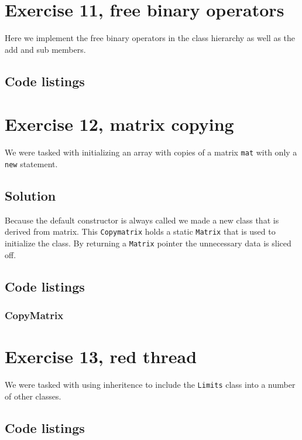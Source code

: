 \documentclass[11pt]{article}
\begin{document}
\section*{Exercise 11, free binary operators}
Here we implement the free binary operators in the class hierarchy as well as the add and sub members.

\subsection*{Code listings}






\section*{Exercise 12, matrix copying}
We were tasked with initializing an array with copies of a matrix \texttt{mat} with only a \texttt{new} statement.

\subsection*{Solution}
Because the default constructor is always called we made a new class that is derived from matrix.
This \texttt{Copymatrix} holds a static \texttt{Matrix} that is used to initialize the class.
By returning a \texttt{Matrix} pointer the unnecessary data is sliced off.

\subsection*{Code listings}





\subsubsection*{CopyMatrix}



\section*{Exercise 13, red thread}
We were tasked with using inheritence to include the \texttt{Limits} class into a number of other classes.

\subsection*{Code listings}




\end{document}
